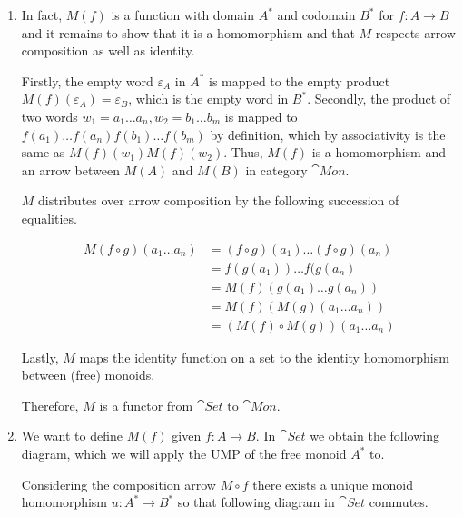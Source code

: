 
\begin{enumerate}
\item In fact, $M(f)$ is a function with domain $A^*$ and codomain $B^*$ for $f : A → B$ and it remains to show that it is a homomorphism and that $M$ respects arrow composition as well as identity.

	Firstly, the empty word $ε_A$ in $A^*$ is mapped to the empty product $M(f)(ε_A) = ε_B$, which is the empty word in $B^*$. Secondly, the product of two words $w_1 = a_1 … a_n, w_2 = b_1 … b_m$ is mapped to $f(a_1) … f(a_n)f(b_1) … f(b_m)$ by definition, which by associativity is the same as $M(f)(w_1)M(f)(w_2)$. Thus, $M(f)$ is a homomorphism and an arrow between $M(A)$ and $M(B)$ in category $\cat{Mon}$.

	$M$ distributes over arrow composition by the following succession of equalities.

	\begin{align*}
	M(f ∘ g)(a_1 … a_n) & = (f ∘ g)(a_1) … (f ∘ g)(a_n) \\
	& = f(g(a_1)) … f(g(a_n) \\
	& = M(f)(g(a_1) … g(a_n)) \\
	& = M(f)(M(g)(a_1 … a_n)) \\
	& = (M(f) ∘ M(g))(a_1 … a_n)
	\end{align*}

	Lastly, $M$ maps the identity function on a set to the identity homomorphism between (free) monoids.

	Therefore, $M$ is a functor from $\cat{Set}$ to $\cat{Mon}$.

\item We want to define $M(f)$ given $f : A → B$. In $\cat{Set}$ we obtain the following diagram, which we will apply the UMP of the free monoid $A^*$ to.


	Considering the composition arrow $M ∘ f$ there exists a unique monoid homomorphism $u : A^* → B^*$ so that following diagram in $\cat{Set}$ commutes.



\end{enumerate}
